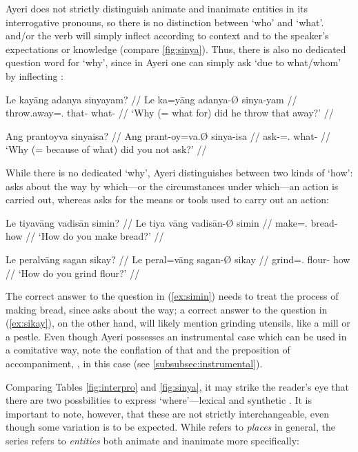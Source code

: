 Ayeri does not strictly distinguish animate and inanimate entities in its
interrogative pronouns, so there is no distinction between `who' and `what'.
 and/or the verb will simply inflect according to context and
to the speaker's expectations or knowledge (compare \autoref{fig:sinya}). Thus,
there is also no dedicated question word for `why', since in Ayeri one can
simply ask `due to what/whom' by inflecting :

\pex
\a\begingl
	\gla Le kayāng adanya sinyayam? //
	\glb Le ka=yāng adanya-Ø sinya-yam //
	\glc \PatTI{} throw.away=\TsgM{}.\Aarg{} that-\Top{} what-\Dat{} //
	\glft `Why (= what for) did he throw that away?' //
\endgl

\a\begingl
	\gla Ang prantoyva sinyaisa? //
	\glb Ang prant-oy=va.Ø sinya-isa //
	\glc \AgtT{} ask-\Neg{}=\Ssg{}.\Top{} what-\Caus{} //
	\glft `Why (= because of what) did you not ask?' //
\endgl

\xe

While there is no dedicated `why', Ayeri distinguishes between two kinds of
`how':  asks about the way by which---or the circumstances
under which---an action is carried out, whereas  asks for the
means or tools used to carry out an action:

\pex
\a\label{ex:simin}\begingl
	\gla Le tiyavāng vadisān simin? //
	\glb Le tiya vāng vadisān-Ø simin //
	\glc \PatTI{} make=\Ssg{}.\Aarg{} bread-\Top{} how //
	\glft `How do you make bread?' //
\endgl

\a\label{ex:sikay}\begingl
	\gla Le peralvāng sagan sikay? //
	\glb Le peral=vāng sagan-Ø sikay //
	\glc \PatTI{} grind=\Ssg{}.\Aarg{} flour-\Top{} how //
	\glft `How do you grind flour?' //
\endgl

\xe

The correct answer to the question in (\ref{ex:simin}) needs to treat the 
process of making bread, since  asks about the way; a 
correct answer to the question in (\ref{ex:sikay}), on the other hand, will 
likely mention grinding utensils, like a mill or a pestle. Even though 
Ayeri possesses an instrumental case which can be used in a comitative way, 
note the conflation of that and the preposition of accompaniment, 
, in this case (see \autoref{subsubsec:instrumental}).

Comparing Tables \ref{fig:interpro} and \ref{fig:sinya}, it may strike the 
reader's eye that there are two possbilities to express 
`where'---lexical  and synthetic . It 
is important to note, however, that these are not strictly interchangeable, 
even though some variation is to be expected. While  refers 
to \emph{places} in general, the  series refers to 
\emph{entities} both animate and inanimate more specifically:

